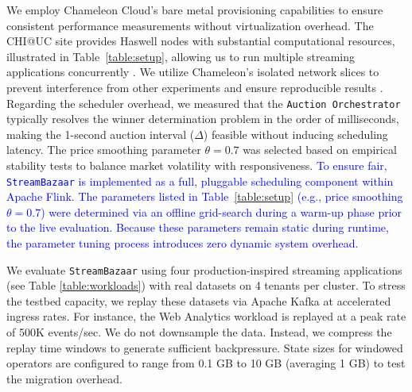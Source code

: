 \documentclass[lettersize,journal]{IEEEtran}
\begin{document}
We employ Chameleon Cloud's bare metal provisioning capabilities to ensure consistent performance measurements without virtualization overhead. The CHI@UC site provides Haswell nodes with substantial computational resources, illustrated in Table~\ref{table:setup}, allowing us to run multiple streaming applications concurrently \cite{chameleon_hardware_2023}. We utilize Chameleon's isolated network slices to prevent interference from other experiments and ensure reproducible results \cite{keahey2020lessons}. Regarding the scheduler overhead, we measured that the \texttt{Auction Orchestrator} typically resolves the winner determination problem in the order of milliseconds, making the 1-second auction interval ($\Delta$) feasible without inducing scheduling latency. The price smoothing parameter $\theta=0.7$ was selected based on empirical stability tests to balance market volatility with responsiveness.
\textcolor{blue}{To ensure fair, \texttt{StreamBazaar} is implemented as a full, pluggable scheduling component within Apache Flink. The parameters listed in Table~\ref{table:setup} (e.g., price smoothing $\theta=0.7$) were determined via an offline grid-search during a warm-up phase prior to the live evaluation. Because these parameters remain static during runtime, the parameter tuning process introduces zero dynamic system overhead.}

We evaluate \texttt{StreamBazaar} using four production-inspired streaming applications (see Table \ref{table:workloads}) with real datasets on 4 tenants per cluster. To stress the testbed capacity, we replay these datasets via Apache Kafka at accelerated ingress rates. For instance, the Web Analytics workload is replayed at a peak rate of 500K events/sec. We do not downsample the data. Instead, we compress the replay time windows to generate sufficient backpressure. State sizes for windowed operators are configured to range from 0.1 GB to 10 GB (averaging 1 GB) to test the migration overhead.

\begin{table}
\centering
\setlength{\extrarowheight}{0pt}
\setlength{\aboverulesep}{0pt}
\setlength{\belowrulesep}{0pt}
\caption{Streaming Applications and Datasets}
\label{table:workloads}
\end{table}
\end{document}
